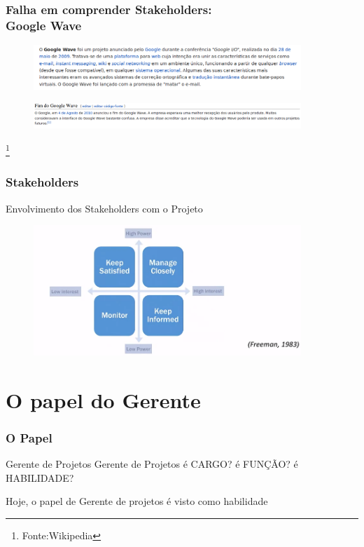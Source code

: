   \begin{frame}
  \frametitle{Falha em comprender Stakeholders: \\
  \small{Google Wave}}
    \begin{figure}
  \centering
  \includegraphics[width = 0.9\textwidth]{figs/fig1_7.png}
 \end{figure}
  \begin{figure}
  \centering
  \includegraphics[width = 0.9\textwidth]{figs/fig1_8.png}
 \end{figure}
 \footnote{Fonte:Wikipedia}
  \end{frame}

  \begin{frame}
   \frametitle{Stakeholders}
   Envolvimento dos Stakeholders com o Projeto
    \begin{figure}
  \centering
  \includegraphics[width = 0.9\textwidth]{figs/fig_proj8.png}
 \end{figure}
  \end{frame}
  
\section{O papel do Gerente}
\begin{frame}
 \frametitle{O Papel}
 \begin{block}{Gerente de Projetos}
  Gerente de Projetos é CARGO? é FUNÇÃO? é HABILIDADE?
 \end{block}
 \pause
 \begin{block}{}
  Hoje, o papel de Gerente de projetos é visto como habilidade
 \end{block}
\end{frame}


